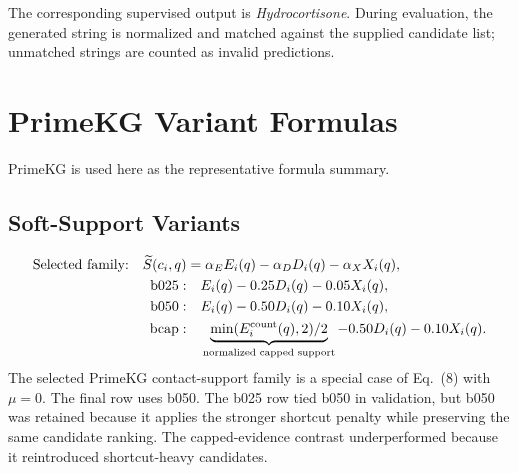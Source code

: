 \documentclass[11pt]{article}
\newcommand{\mainequation}[1]{Eq.~(#1)}
\begin{document}
    \begin{center}
    {\setlength{\fboxsep}{6pt}
    }
    \end{center}

    The corresponding supervised output is \emph{Hydrocortisone}. During evaluation, the generated string is normalized and matched against the supplied candidate list; unmatched strings are counted as invalid predictions.

    \section{PrimeKG Variant Formulas}

    PrimeKG is used here as the representative formula summary.

    \subsection{Soft-Support Variants}

    \[
    \begin{aligned}
    \text{Selected family:}\quad
    \widetilde{S}(c_i,q)&=\alpha_EE_i(q)-\alpha_DD_i(q)-\alpha_XX_i(q),\\
    \mathrm{b025}:&\quad E_i(q)-0.25D_i(q)-0.05X_i(q),\\
    \mathrm{b050}:&\quad E_i(q)-0.50D_i(q)-0.10X_i(q),\\
    \mathrm{bcap}:&\quad \underbrace{\min(E^{\mathrm{count}}_i(q),2)/2}_{\text{normalized capped support}}-0.50D_i(q)-0.10X_i(q).
    \end{aligned}
    \]
    The selected PrimeKG contact-support family is a special case of \mainequation{8} with \(\mu=0\). The final row uses b050. The b025 row tied b050 in validation, but b050 was retained because it applies the stronger shortcut penalty while preserving the same candidate ranking. The capped-evidence contrast underperformed because it reintroduced shortcut-heavy candidates.
\end{document}
